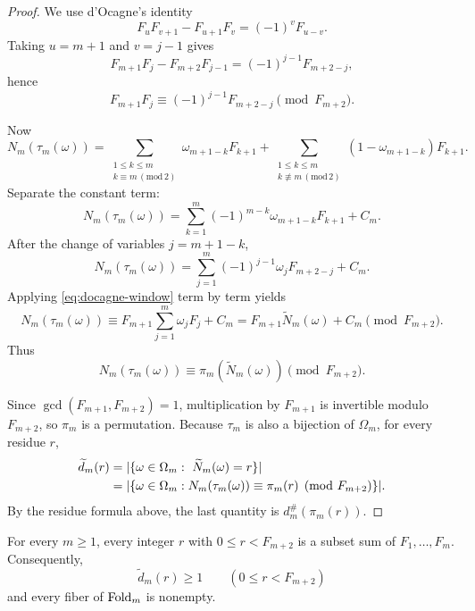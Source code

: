 \begin{proof}
We use d'Ocagne's identity
\[
  F_uF_{v+1}-F_{u+1}F_v=(-1)^vF_{u-v}.
\]
Taking \(u=m+1\) and \(v=j-1\) gives
\[
  F_{m+1}F_j-F_{m+2}F_{j-1}=(-1)^{j-1}F_{m+2-j},
\]
hence
\begin{equation}\label{eq:docagne-window}
  F_{m+1}F_j\equiv (-1)^{j-1}F_{m+2-j}\pmod{F_{m+2}}.
\end{equation}

Now
\[
  N_m(\tau_m(\omega))
  =
  \sum_{\substack{1\le k\le m\\ k\equiv m \,(\mathrm{mod}\,2)}}
  \omega_{m+1-k}F_{k+1}
  +
  \sum_{\substack{1\le k\le m\\ k\not\equiv m \,(\mathrm{mod}\,2)}}
  (1-\omega_{m+1-k})F_{k+1}.
\]
Separate the constant term:
\[
  N_m(\tau_m(\omega))
  =
  \sum_{k=1}^m(-1)^{m-k}\omega_{m+1-k}F_{k+1}+C_m.
\]
After the change of variables \(j=m+1-k\),
\[
  N_m(\tau_m(\omega))
  =
  \sum_{j=1}^m(-1)^{j-1}\omega_jF_{m+2-j}+C_m.
\]
Applying \eqref{eq:docagne-window} term by term yields
\[
  N_m(\tau_m(\omega))
  \equiv
  F_{m+1}\sum_{j=1}^m \omega_jF_j + C_m
  =
  F_{m+1}\widetilde N_m(\omega)+C_m
  \pmod{F_{m+2}}.
\]
Thus
\begin{equation}\label{eq:tau-congruence}
  N_m(\tau_m(\omega))\equiv \pi_m(\widetilde N_m(\omega))\pmod{F_{m+2}}.
\end{equation}

Since \(\gcd(F_{m+1},F_{m+2})=1\), multiplication by \(F_{m+1}\) is invertible
modulo \(F_{m+2}\), so \(\pi_m\) is a permutation.  Because \(\tau_m\) is also
a bijection of \(\Omega_m\), for every residue \(r\),
\begin{align*}
  \widetilde d_m(r)
  &=
  \lvert \{\omega\in\Omega_m:\ \widetilde N_m(\omega)=r\} \rvert \\
  &=
  \lvert 
    \left\{
      \omega\in\Omega_m:
      N_m(\tau_m(\omega))\equiv \pi_m(r)\pmod{F_{m+2}}
    \right\}
   \rvert.
\end{align*}
By the residue formula above, the last quantity is
\(d_m^\#(\pi_m(r))\).
\end{proof}

\begin{lemma}
\label{lem:interval-completeness}
For every \(m\ge1\), every integer \(r\) with \(0\le r<F_{m+2}\) is a
subset sum of \(F_1,\ldots,F_m\).  Consequently,
\[
  \widetilde d_m(r)\ge1\qquad(0\le r<F_{m+2})
\]
and every fiber of \(\mathrm{Fold}_m\) is nonempty.
\end{lemma}


